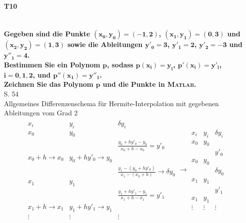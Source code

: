 \documentclass[10pt,a4paper]{article}
\begin{document}
	
	\clearpage
	
	
	\paragraph{T10}\mbox{}\\
	\textbf{%
		Gegeben sind die Punkte $\mathbf{(x_0,y_0)=(-1,2)}$, $\mathbf{(x_1,y_1)=(0,3)}$ und $\mathbf{(x_2,y_2)=(1,3)}$ sowie die Ableitungen $\mathbf{y'_0=3}$, $\mathbf{y'_1=2}$, $\mathbf{y'_2=-3}$ und $\mathbf{y''_1=4}$.\\
		Bestimmen Sie ein Polynom $\mathbf{p}$, sodass $\mathbf{p(x_i)=y_i}$, $\mathbf{p'(x_i)=y'_i}$, $\mathbf{i=0,1,2}$, und $\mathbf{p''(x_1)=y''_1}$.\\
		Zeichnen Sie das Polynom $\mathbf{p}$ und die Punkte in {\scshape Matlab}.
	}\\
	S. 54 \\
	Allgemeines Differenzenschema für Hermite-Interpolation mit gegebenen Ableitungen vom Grad 2
	\begin{align*}
	\begin{array}{ll|c}
		x_i                   & y_i                       &                        \delta y_i                        \\ \hline
		x_0                   & y_0                       &  \\
		                      &                           &          \frac{y_0+hy'_0-y_0}{x_0+h-x_0} = y'_0          \\
		x_0+h \rightarrow x_0 & y_0+hy'_0 \rightarrow y_0 &  \\
		                      &                           & \frac{y_1-(y_0+hy'_0)}{x_1-(x_0+h)}\rightarrow\delta y_0 \\
		x_1                   & y_1                       &  \\
		                      &                           &          \frac{y_1+hy'_1-y_1}{x_1+h-x_1} = y'_1          \\
		x_1+h \rightarrow x_1 & y_1+hy'_1 \rightarrow y_1 &  \\
		\vdots                & \vdots                    &                          \vdots
	\end{array} \rightarrow
		\begin{array}{ll|c}
			x_i    & y_i    & \delta y_i \\ \hline
			x_0    & y_0    &  \\
			       &        &    y'_0    \\
			x_0    & y_0    &  \\
			       &        & \delta y_0 \\
			x_1    & y_1    &  \\
			       &        &    y'_1    \\
			x_1    & y_1    &  \\
			\vdots & \vdots &   \vdots
		\end{array}
	\end{align*}
\end{document}
